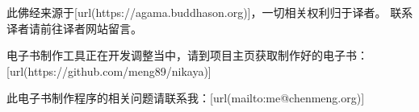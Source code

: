 此佛经来源于[url(https://agama.buddhason.org)]，一切相关权利归于译者。 联系译者请前往译者网站留言。
\blank

电子书制作工具正在开发调整当中，请到项目主页获取制作好的电子书：
[url(https://github.com/meng89/nikaya)]

\blank
此电子书制作程序的相关问题请联系我：[url(mailto:me@chenmeng.org)]